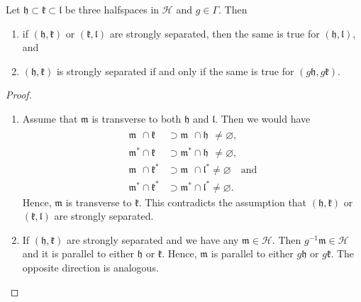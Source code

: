 \begin{lemma}
  \label{lem:strongly-sep}
  Let \(\mathfrak{h} \subset \mathfrak{k} \subset \mathfrak{l}\) be three halfspaces in \(\mathcal{H}\) and \(g \in \Gamma\). Then
  \begin{enumerate}
  \item if \((\mathfrak{h}, \mathfrak{k})\) or \((\mathfrak{k}, \mathfrak{l})\) are strongly separated, then the same is true for \((\mathfrak{h}, \mathfrak{l})\), and
  \item \((\mathfrak{h}, \mathfrak{k})\) is strongly separated if and only if the same is true for \((g\mathfrak{h}, g\mathfrak{k})\).
  \end{enumerate}
\end{lemma}

\begin{proof}~\vspace{-6pt}
  \begin{enumerate}
  \item Assume that \(\mathfrak{m}\) is transverse to both \(\mathfrak{h}\) and \(\mathfrak{l}\). Then we would have
    \begin{align*}
      \mathfrak{m}^{\phantom{\ast}} \cap \mathfrak{k}^{\phantom{\ast}} & \supset \mathfrak{m}^{\phantom{\ast}} \cap \mathfrak{h}^{\phantom{\ast}} \neq \varnothing,\\
      \mathfrak{m}^\ast \cap \mathfrak{k}^{\phantom{\ast}}  & \supset \mathfrak{m}^\ast \cap \mathfrak{h}^{\phantom{\ast}} \neq \varnothing,\\
      \mathfrak{m}^{\phantom{\ast}} \cap \mathfrak{k}^\ast & \supset \mathfrak{m}^{\phantom{\ast}} \cap \mathfrak{l}^\ast \neq \varnothing\quad \text{and}\\
      \mathfrak{m}^\ast \cap \mathfrak{k}^\ast & \supset \mathfrak{m}^\ast \cap \mathfrak{l}^\ast \neq \varnothing.
    \end{align*}
    Hence, \(\mathfrak{m}\) is transverse to \(\mathfrak{k}\). This contradicts the assumption that \((\mathfrak{h}, \mathfrak{k})\) or \((\mathfrak{k}, \mathfrak{l})\) are strongly separated.
  \item If \((\mathfrak{h}, \mathfrak{k})\) are strongly separated and we have any \(\mathfrak{m} \in \mathcal{H}\). Then \(g^{-1}\mathfrak{m} \in \mathcal{H}\) and it is parallel to either \(\mathfrak{h}\) or \(\mathfrak{k}\). Hence, \(\mathfrak{m}\) is parallel to either \(g\mathfrak{h}\) or \(g\mathfrak{k}\). The opposite direction is analogous.
  \end{enumerate}
\end{proof}

